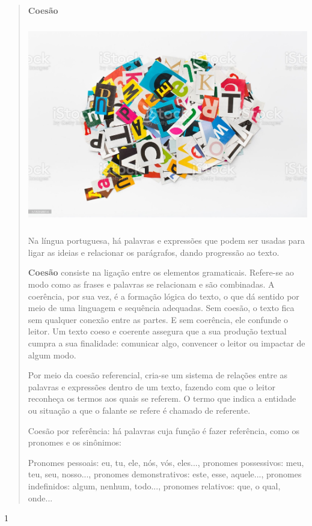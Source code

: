 \begin{itemize}
{{{\begin{itemize}
\begin{itemize}
\begin{itemize}
\begin{quote}
\textbf{Coesão }

\includegraphics[width=5.17173in,height=3.44883in]{media/image35.jpeg}

Na língua portuguesa, há palavras e expressões que podem ser usadas para
ligar as ideias e relacionar os parágrafos, dando progressão ao texto.

\textbf{Coesão} consiste na ligação entre os elementos gramaticais.
Refere-se ao modo como as frases e palavras se relacionam e são
combinadas. A coerência, por sua vez, é a formação lógica do texto, o
que dá sentido por meio de uma linguagem e sequência adequadas. Sem
coesão, o texto fica sem qualquer conexão entre as partes. E sem
coerência, ele confunde o leitor. Um texto coeso e coerente assegura que
a sua produção textual cumpra a sua finalidade: comunicar algo,
convencer o leitor ou impactar de algum modo.

Por meio da coesão referencial, cria-se um sistema de relações entre as
palavras e expressões dentro de um texto, fazendo com que o leitor
reconheça os termos aos quais se referem. O termo que indica a entidade
ou situação a que o falante se refere é chamado de referente.

Coesão por referência: há palavras cuja função é fazer referência, como
os pronomes e os sinônimos:

Pronomes pessoais: eu, tu, ele, nós, vós, eles..., pronomes possessivos:
meu, teu, seu, nosso..., pronomes demonstrativos: este, esse, aquele...,
pronomes indefinidos: algum, nenhum, todo..., pronomes relativos: que, o
qual, onde...
\end{quote}


\num{1}


\end{itemize}
\end{itemize}
\end{itemize}}}}
\end{itemize}
